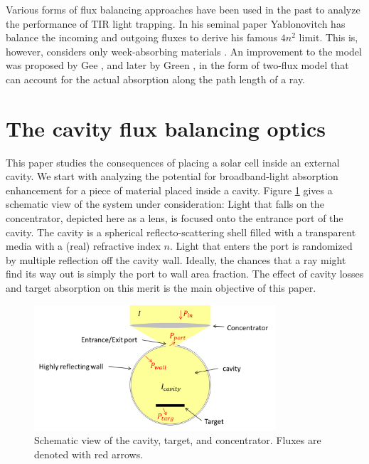 \documentclass[a4paper]{article}
\begin{document}
\par Various forms of flux balancing approaches have been used in the past to analyze the performance of TIR light trapping. In his seminal paper  Yablonovitch has balance the incoming and outgoing fluxes to derive his famous $4n^2$ limit. This is, however, considers only week-absorbing materials \cite{Yablonovitch1982} . An improvement to the model was proposed by Gee \cite{Gee1988}, and later by Green \cite{Green2002}, in the form of two-flux model that can account for the actual absorption along the path length of a ray.
 
\listoftodos\bigskip
\section{The cavity flux balancing optics}

\noindent This paper studies the consequences of placing a solar cell inside an external cavity. We start with analyzing the potential for broadband-light absorption enhancement for a piece of material placed inside a cavity. Figure \ref{fig:sys} gives a schematic view of the system under consideration: Light that falls on the concentrator, depicted here as a lens, is focused onto the entrance port of the cavity. The cavity is a spherical reflecto-scattering shell filled with a transparent media with a (real) refractive index $n$. Light that enters the port is randomized by multiple reflection off the cavity wall. Ideally, the chances that a ray might find its way out is simply the port to wall area fraction. The effect of cavity losses and target absorption on this merit is the main objective of this paper.
\par

\begin{figure}
\centering
\includegraphics[width=0.8\textwidth]{figures/cav3.png}
\caption{Schematic view of the cavity, target, and concentrator. Fluxes are denoted with red arrows.}
\label{fig:sys}
\end{figure}
\end{document}
